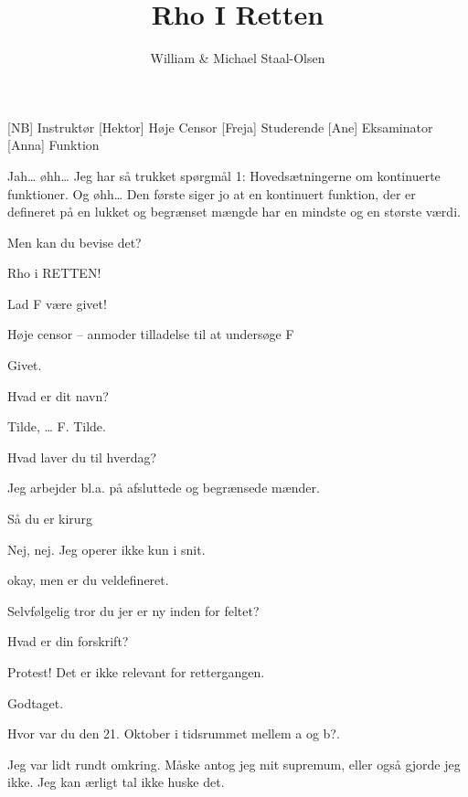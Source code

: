 \documentclass[a4paper,11pt]{article}
\title{Rho I Retten}
\author{William \& Michael Staal-Olsen}
\begin{document}
\maketitle

\begin{roles}
[NB] Instruktør
[Hektor] Høje Censor
[Freja] Studerende
[Ane] Eksaminator
[Anna] Funktion
\end{roles}

\begin{sketch}

 Jah… øhh… Jeg har så trukket spørgmål 1: Hovedsætningerne om kontinuerte funktioner. Og øhh… Den første siger jo at en kontinuert funktion, der er defineret på en lukket og begrænset mængde har en mindste og en største værdi.

  Men kan du bevise det?


 Rho i RETTEN!

 Lad F være givet!


 Høje censor – anmoder tilladelse til at undersøge F

 Givet.

 Hvad er dit navn?

 Tilde, … F. Tilde.

  Hvad laver du til hverdag?

 Jeg arbejder bl.a. på afsluttede og begrænsede mænder.

 Så du er kirurg

 Nej, nej. Jeg operer ikke kun i snit.

 okay, men er du veldefineret.

 Selvfølgelig tror du jer er ny inden for feltet? %

 Hvad er din forskrift?

 Protest! Det er ikke relevant for rettergangen.

 Godtaget.

 Hvor var du den 21. Oktober i tidsrummet mellem a og b?.


 Jeg var lidt rundt omkring. Måske antog jeg mit supremum, eller også gjorde jeg ikke. Jeg kan ærligt tal ikke huske det.


\end{sketch}
\end{document}
